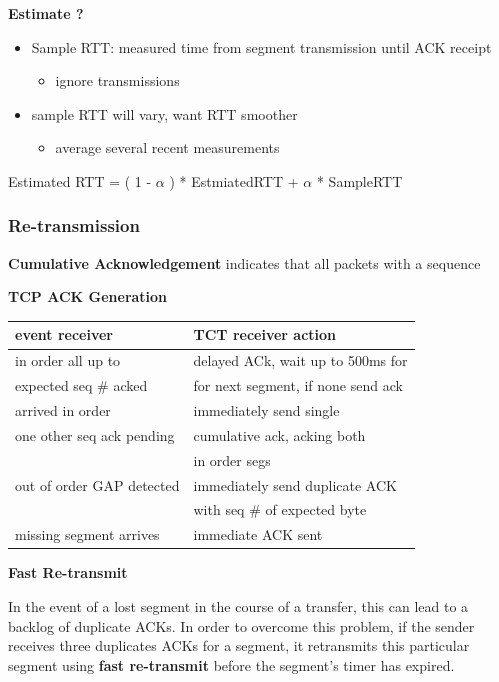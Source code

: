 \documentclass[11pt]{article}
\begin{document}
\textbf{Estimate ?}
\begin{itemize}
\item Sample RTT: measured time from segment transmission until ACK
receipt 
\begin{itemize}
\item ignore transmissions
\end{itemize}
\item sample RTT will vary, want RTT smoother
\begin{itemize}
\item average several recent measurements
\end{itemize}
\end{itemize}


Estimated RTT = ( 1 - \(\alpha\) ) * EstmiatedRTT + \(\alpha\) * SampleRTT

\subsubsection{Re-transmission}
\label{sec:orgbcb6ea2}
\textbf{Cumulative Acknowledgement} indicates that all packets with a sequence


\textbf{TCP ACK Generation}

\begin{center}
\begin{tabular}{ll}
\hline
event receiver & TCT receiver action\\
\hline
in order all up to & delayed ACk, wait up to 500ms for\\
expected seq \# acked & for next segment, if none send ack\\
\hline
arrived in order & immediately send single\\
one other seq ack pending & cumulative ack, acking both\\
 & in order segs\\
\hline
out of order GAP detected & immediately send duplicate ACK\\
 & with seq \# of expected byte\\
\hline
missing segment arrives & immediate ACK sent\\
\hline
\end{tabular}
\end{center}


\textbf{Fast Re-transmit}

In the event of a lost segment in the course of a transfer, this can
lead to a backlog of duplicate ACKs. In order to overcome this problem,
if the sender receives three duplicates ACKs for a segment, it
retransmits this particular segment using \textbf{fast re-transmit} before the
segment's timer has expired.
\end{document}
